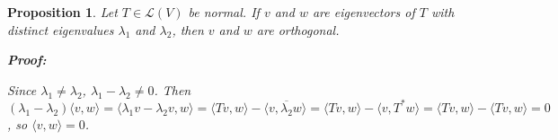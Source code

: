\documentclass{article}
\theoremstyle{colontheorem}
\newtheorem{proposition}[theorem]{Proposition}
\newenvironment{Proposition}
{
	\begin{mdframed}[backgroundcolor=PropPink!10]
	\begin{proposition}
}
{
	\end{proposition}
	\end{mdframed}
	
	\vspace{.15in}
}
\newenvironment{Proof}
{
	\begin{mdframed}[backgroundcolor=ProofPurple!10]
	\textbf{Proof:}%
}
{
	\end{mdframed}
	
	\vspace{.085in}
}
\begin{document}
\begin{Proposition}
	
	Let $T \in \mathcal{L}(V)$ be normal. If $v$ and $w$ are eigenvectors of $T$ with distinct eigenvalues $\lambda_1$ and $\lambda_2$, then $v$ and $w$ are orthogonal.
	
	\begin{Proof}
		Since $\lambda_1 \neq \lambda_2$, $\lambda_1 - \lambda_2 \neq 0$. Then $(\lambda_1 - \lambda_2) \langle v, w \rangle = \langle \lambda_1 v - \lambda_2 v, w \rangle = \langle Tv, w \rangle - \langle v, \overline{\lambda_2} w \rangle = \langle Tv, w \rangle - \langle v, T^* w \rangle = \langle Tv, w \rangle - \langle Tv, w \rangle = 0$, so $\langle v, w \rangle = 0$.
		
	\end{Proof}
	
\end{Proposition}
\end{document}
